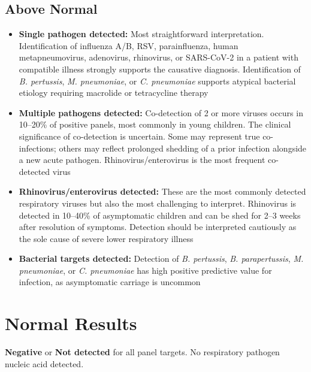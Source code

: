 \subsection*{Above Normal}
\begin{itemize}
  \item \textbf{Single pathogen detected:} Most straightforward interpretation. Identification of influenza A/B, RSV, parainfluenza, human metapneumovirus, adenovirus, rhinovirus, or SARS-CoV-2 in a patient with compatible illness strongly supports the causative diagnosis. Identification of \textit{B. pertussis}, \textit{M. pneumoniae}, or \textit{C. pneumoniae} supports atypical bacterial etiology requiring macrolide or tetracycline therapy
  \item \textbf{Multiple pathogens detected:} Co-detection of 2 or more viruses occurs in 10--20\% of positive panels, most commonly in young children. The clinical significance of co-detection is uncertain. Some may represent true co-infections; others may reflect prolonged shedding of a prior infection alongside a new acute pathogen. Rhinovirus/enterovirus is the most frequent co-detected virus
  \item \textbf{Rhinovirus/enterovirus detected:} These are the most commonly detected respiratory viruses but also the most challenging to interpret. Rhinovirus is detected in 10--40\% of asymptomatic children and can be shed for 2--3 weeks after resolution of symptoms. Detection should be interpreted cautiously as the sole cause of severe lower respiratory illness
  \item \textbf{Bacterial targets detected:} Detection of \textit{B. pertussis}, \textit{B. parapertussis}, \textit{M. pneumoniae}, or \textit{C. pneumoniae} has high positive predictive value for infection, as asymptomatic carriage is uncommon
\end{itemize}

\section*{Normal Results}
\textbf{Negative} or \textbf{Not detected} for all panel targets. No respiratory pathogen nucleic acid detected.

